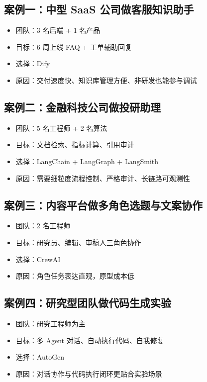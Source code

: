\subsection{案例一：中型 SaaS 公司做客服知识助手}

\begin{itemize}[leftmargin=2em]
\item 团队：3 名后端 + 1 名产品
\item 目标：6 周上线 FAQ + 工单辅助回复
\item 选择：Dify
\item 原因：交付速度快、知识库管理方便、非研发也能参与调试
\end{itemize}

\subsection{案例二：金融科技公司做投研助理}

\begin{itemize}[leftmargin=2em]
\item 团队：5 名工程师 + 2 名算法
\item 目标：文档检索、指标计算、引用审计
\item 选择：LangChain + LangGraph + LangSmith
\item 原因：需要细粒度流程控制、严格审计、长链路可观测性
\end{itemize}

\subsection{案例三：内容平台做多角色选题与文案协作}

\begin{itemize}[leftmargin=2em]
\item 团队：2 名工程师
\item 目标：研究员、编辑、审稿人三角色协作
\item 选择：CrewAI
\item 原因：角色任务表达直观，原型成本低
\end{itemize}

\subsection{案例四：研究型团队做代码生成实验}

\begin{itemize}[leftmargin=2em]
\item 团队：研究工程师为主
\item 目标：多 Agent 对话、自动执行代码、自我修复
\item 选择：AutoGen
\item 原因：对话协作与代码执行闭环更贴合实验场景
\end{itemize}

